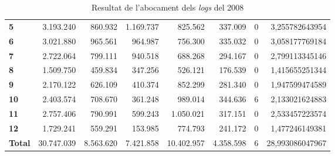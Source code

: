 \begin{table}[h!]
\begin{adjustbox}{width=1.2\textwidth, center}
\begin{tabular}{|l|r|r|r|r|r|r|r|}
            \midrule
            \textbf{5}     & 3.193.240  & 860.932   & 1.169.737 & 825.562    & 337.009   & 0 & 3,255782643954  \\
            \textbf{6}     & 3.021.880  & 965.561   & 964.987   & 756.300    & 335.032   & 0 & 3,058177769184  \\
            \textbf{7}     & 2.722.064  & 799.111   & 940.518   & 688.268    & 294.167   & 0 & 2,799113345146  \\
            \textbf{8}     & 1.509.750  & 459.834   & 347.256   & 526.121    & 176.539   & 0 & 1,415655251344  \\
            \midrule
            \textbf{9}     & 2.170.122  & 626.109   & 410.374   & 852.299    & 281.340   & 0 & 1,947599474589  \\
            \textbf{10}    & 2.403.574  & 708.670   & 361.248   & 989.014    & 344.636   & 6 & 2,133021624883  \\
            \textbf{11}    & 2.757.406  & 790.991   & 599.243   & 1.050.021  & 317.151   & 0 & 2,533457223574  \\
            \textbf{12}    & 1.729.241  & 559.291   & 153.985   & 774.793    & 241.172   & 0 & 1,477246149381  \\
            \midrule
            \textbf{Total} & 30.747.039 & 8.563.620 & 7.421.858 & 10.402.957 & 4.358.598 & 6 & 28,993086047967 \\
            \bottomrule
        \end{tabular}
    \end{adjustbox}
    \caption{Resultat de l'abocament dels \textit{logs} del 2008}
    \label{tab:logs-table-2008}
\end{table}
